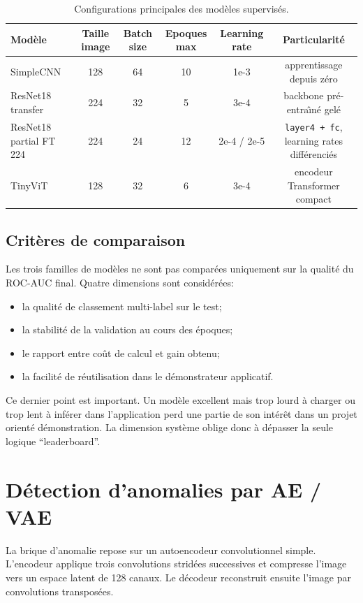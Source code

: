 \documentclass[11pt,a4paper]{article}
\newif\ifsectionbreakenabled
\let\oldsection\section
\renewcommand{\section}[1]{%
    \ifsectionbreakenabled
        \clearpage
    \else
        \sectionbreakenabledtrue
    \fi
    \oldsection{#1}%
}
\begin{document}
\begin{table}[H]
    \centering
    \caption{Configurations principales des mod\`eles supervis\'es.}
    \small
    \begin{tabular}{p{3.1cm}c c c c c}
        \toprule
        Mod\`ele & Taille image & Batch size & Epoques max & Learning rate & Particularit\'e \\
        \midrule
        SimpleCNN & 128 & 64 & 10 & 1e-3 & apprentissage depuis z\'ero \\
        ResNet18 transfer & 224 & 32 & 5 & 3e-4 & backbone pr\'e-entra\^\i n\'e gel\'e \\
        ResNet18 partial FT 224 & 224 & 24 & 12 & 2e-4 / 2e-5 & \texttt{layer4 + fc}, learning rates diff\'erenci\'es \\
        TinyViT & 128 & 32 & 6 & 3e-4 & encodeur Transformer compact \\
        \bottomrule
    \end{tabular}
\end{table}

\subsection{Crit\`eres de comparaison}
Les trois familles de mod\`eles ne sont pas compar\'ees uniquement sur la qualit\'e du ROC-AUC final. Quatre dimensions sont consid\'er\'ees:
\begin{itemize}
    \item la qualit\'e de classement multi-label sur le test;
    \item la stabilit\'e de la validation au cours des \'epoques;
    \item le rapport entre co\^ut de calcul et gain obtenu;
    \item la facilit\'e de r\'eutilisation dans le d\'emonstrateur applicatif.
\end{itemize}

Ce dernier point est important. Un mod\`ele excellent mais trop lourd \`a charger ou trop lent \`a inf\'erer dans l'application perd une partie de son int\'er\^et dans un projet orient\'e d\'emonstration. La dimension syst\`eme oblige donc \`a d\'epasser la seule logique ``leaderboard''.

\section{D\'etection d'anomalies par AE / VAE}
La brique d'anomalie repose sur un autoencodeur convolutionnel simple. L'encodeur applique trois convolutions strid\'ees successives et compresse l'image vers un espace latent de 128 canaux. Le d\'ecodeur reconstruit ensuite l'image par convolutions transpos\'ees.
\end{document}
